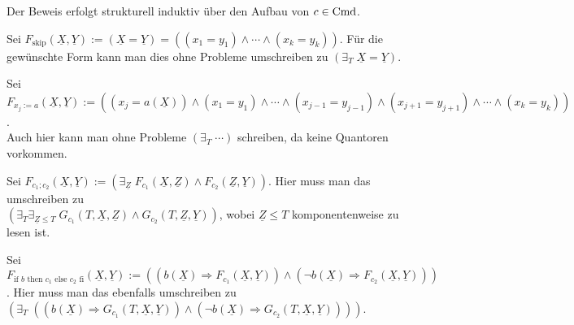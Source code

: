 \begin{Beweis}
    Der Beweis erfolgt strukturell induktiv über den Aufbau von $c \in \text{Cmd}$.
    
    Sei $F_\text{skip}(\underline{X}, \underline{Y}) := (\underline{X} = \underline{Y}) =
    ((x_1 = y_1) \land \dotsb \land (x_k = y_k))$.
    Für die gewünschte Form kann man dies ohne Probleme umschreiben zu
    $(\exists_T\; \underline{X} = \underline{Y})$.
    
    Sei $F_{x_j := a}(\underline{X}, \underline{Y}) := ((x_j = a(\underline{X})) \land
    (x_1 = y_1) \land \dotsb \land (x_{j-1} = y_{j-1}) \land (x_{j+1} = y_{j+1}) \land \dotsb \land
    (x_k = y_k))$.\\
    Auch hier kann man ohne Probleme $(\exists_T\; \cdots)$ schreiben, da keine
    Quantoren vorkommen.
    
    Sei $F_{c_1; c_2}(\underline{X}, \underline{Y}) := (\exists_{\underline{Z}}\;
    F_{c_1}(\underline{X}, \underline{Z}) \land F_{c_2}(\underline{Z}, \underline{Y}))$.
    Hier muss man das umschreiben zu\\
    $(\exists_T \exists_{\underline{Z} \le T}\; G_{c_1}(T, \underline{X}, \underline{Z}) \land
    G_{c_2}(T, \underline{Z}, \underline{Y}))$, wobei $\underline{Z} \le T$ komponentenweise zu
    lesen ist.
    
    Sei $F_{\text{if } b \text{ then } c_1 \text{ else } c_2 \text{ fi}}(\underline{X},
    \underline{Y}) := ((b(\underline{X}) \Rightarrow F_{c_1}(\underline{X}, \underline{Y})) \land
    (\lnot b(\underline{X}) \Rightarrow F_{c_2}(\underline{X}, \underline{Y})))$.
    Hier muss man das ebenfalls umschreiben zu
    $(\exists_T\; ((b(\underline{X}) \Rightarrow G_{c_1}(T, \underline{X}, \underline{Y})) \land
    (\lnot b(\underline{X}) \Rightarrow G_{c_2}(T, \underline{X}, \underline{Y}))))$.
    

\end{Beweis}
